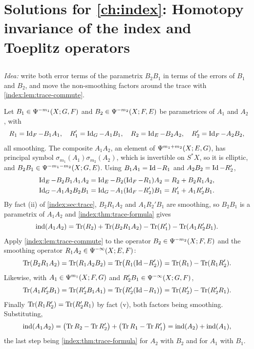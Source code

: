 \providecommand{\Ginf}{G^{-\infty}}
\providecommand{\Gloop}{G^{-\infty}_{(1)}}
\providecommand{\PsiT}[1]{\Psi^{#1}_{\mathcal T}}
\providecommand{\Hardy}{\mathcal{C}^\infty_{+}}
\providecommand{\Hardym}{\mathcal{C}^\infty_{-}}
\providecommand{\wind}{\operatorname{wind}}
\providecommand{\Iso}{\operatorname{Iso}}

\section{Solutions for \cref{ch:index}: Homotopy invariance of the index and Toeplitz operators}\label{solutions:index}

\subsection*{}
\emph{Idea:} write both error terms of the parametrix $B_2B_1$ in terms of the
errors of $B_1$ and $B_2$, and move the non-smoothing factors around the trace
with \cref{index:lem:trace-commute}.

Let $B_1\in\Psi^{-m_1}(X;G,F)$ and $B_2\in\Psi^{-m_2}(X;F,E)$ be parametrices of
$A_1$ and $A_2$, with
\begin{equation*}
  R_1=\operatorname{Id}_F-B_1A_1,\quad R_1'=\operatorname{Id}_G-A_1B_1,\quad R_2=\operatorname{Id}_E-B_2A_2,\quad
  R_2'=\operatorname{Id}_F-A_2B_2,
\end{equation*}
all smoothing. The composite $A_1A_2$, an element of $\Psi^{m_1+m_2}(X;E,G)$, has
principal symbol $\sigma_{m_1}(A_1)\sigma_{m_2}(A_2)$, which is invertible on $S^*X$, so it is
elliptic, and $B_2B_1\in\Psi^{-m_1-m_2}(X;G,E)$. Using $B_1A_1=\operatorname{Id}-R_1$ and
$A_2B_2=\operatorname{Id}-R_2'$,
\begin{align*}
  \operatorname{Id}_E-B_2B_1A_1A_2&=\operatorname{Id}_E-B_2(\operatorname{Id}_F-R_1)A_2=R_2+B_2R_1A_2,\\
  \operatorname{Id}_G-A_1A_2B_2B_1&=\operatorname{Id}_G-A_1(\operatorname{Id}_F-R_2')B_1=R_1'+A_1R_2'B_1 .
\end{align*}
By fact (ii) of \cref{index:sec:trace}, $B_2R_1A_2$ and $A_1R_2'B_1$ are smoothing,
so $B_2B_1$ is a parametrix of $A_1A_2$ and \cref{index:thm:trace-formula} gives
\begin{equation*}
  \operatorname{ind}(A_1A_2)=\operatorname{Tr}(R_2)+\operatorname{Tr}(B_2R_1A_2)-\operatorname{Tr}(R_1')-\operatorname{Tr}(A_1R_2'B_1).
\end{equation*}
Apply \cref{index:lem:trace-commute} to the operator $B_2\in\Psi^{-m_2}(X;F,E)$ and the
smoothing operator $R_1A_2\in\Psi^{-\infty}(X;E,F)$:
\begin{equation*}
  \operatorname{Tr}(B_2R_1A_2)=\operatorname{Tr}(R_1A_2B_2)=\operatorname{Tr}\bigl(R_1(\operatorname{Id}-R_2')\bigr)=\operatorname{Tr}(R_1)-\operatorname{Tr}(R_1R_2').
\end{equation*}
Likewise, with $A_1\in\Psi^{m_1}(X;F,G)$ and $R_2'B_1\in\Psi^{-\infty}(X;G,F)$,
\begin{equation*}
  \operatorname{Tr}(A_1R_2'B_1)=\operatorname{Tr}(R_2'B_1A_1)=\operatorname{Tr}\bigl(R_2'(\operatorname{Id}-R_1)\bigr)=\operatorname{Tr}(R_2')-\operatorname{Tr}(R_2'R_1).
\end{equation*}
Finally $\operatorname{Tr}(R_1R_2')=\operatorname{Tr}(R_2'R_1)$ by fact (v), both factors being smoothing.
Substituting,
\begin{equation*}
  \operatorname{ind}(A_1A_2)=\bigl(\operatorname{Tr} R_2-\operatorname{Tr} R_2'\bigr)+\bigl(\operatorname{Tr} R_1-\operatorname{Tr} R_1'\bigr)
  =\operatorname{ind}(A_2)+\operatorname{ind}(A_1),
\end{equation*}
the last step being \cref{index:thm:trace-formula} for $A_2$ with $B_2$ and for $A_1$
with $B_1$.

